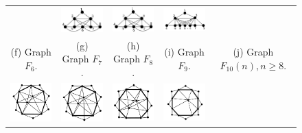 \documentclass{dmgt}
\begin{document}
\begin{landscape}
\begin{figure}[htb]
\begin{tabular}{ccccc}
    & 
    \includegraphics[width=3cm]{f8.png} 
    & 
    \includegraphics[width=3cm]{f9.png} 
    & 
    \includegraphics[width=3cm]{f10n2.png} 
    \\ %
    \footnotesize 
    (f)  \footnotesize Graph $F_6$. 
    & 
    \footnotesize (g) Graph $F_7$.
    & 
    \footnotesize (h) Graph $F_8$.
    & 
    \footnotesize (i) Graph $F_9$.
    & 
    \footnotesize (j) Graph $F_{10}(n), n\geq  8$.
    \\%
        \includegraphics[width=3cm]{f11.png} 
    & 
    \includegraphics[width=3cm]{f12.png} 
    & 
    \includegraphics[width=3cm]{f13.png} 
    & 
    \includegraphics[width=3cm]{f14.png} 

\end{tabular}
\end{figure}
\end{landscape}
\end{document}
